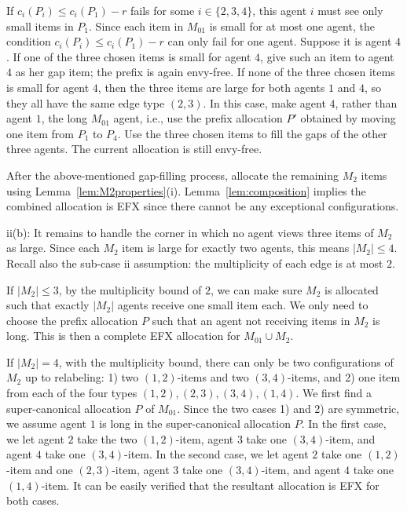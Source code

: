 \documentclass{article}
\theoremstyle{definition}
\begin{document}
If $c_i(P_i)\leq c_i(P_1)-r$ fails for some $i\in\{2,3,4\}$, this agent $i$ must see only small items in $P_1$.  
Since each item in $M_{01}$ is small for at most one agent, the condition $c_i(P_i)\leq c_i(P_1)-r$ can only fail for one agent.
Suppose it is agent $4$.
If one of the three chosen items is small for agent $4$, give such an item to agent $4$ as her gap item; the prefix is again envy-free.  
If none of the
three chosen items is small for agent $4$, then the three items are large for both agents $1$ and $4$, so they all have the same edge type $(2,3)$.  In this case, make agent $4$, rather than agent $1$, the long
$M_{01}$ agent, i.e., use the prefix allocation $P'$ obtained by moving one item from $P_1$ to $P_4$.
Use the three chosen items to fill the gaps of the other
three agents.
The current allocation is still envy-free.

After the above-mentioned gap-filling process, allocate the remaining $M_2$ items using Lemma~\ref{lem:M2properties}(i). Lemma~\ref{lem:composition} implies the combined allocation is EFX since there cannot be any exceptional configurations.

ii(b): It remains to handle the corner in which no agent views three items of $M_2$ as large.  Since each $M_2$ item is large for exactly two agents, this means $|M_2|\le 4$.  
Recall also the sub-case ii assumption: the multiplicity of each edge is at most $2$.

If $|M_2|\leq 3$, by the multiplicity bound of $2$, we can make sure $M_2$ is allocated such that exactly $|M_2|$ agents receive one small item each.
We only need to choose the prefix allocation $P$ such that an agent not receiving items in $M_2$ is long.
This is then a complete EFX allocation for $M_{01}\cup M_2$.

If $|M_2|=4$, with the multiplicity bound, there can only be two configurations of $M_2$ up to relabeling: 1) two $(1,2)$-items and two $(3,4)$-items, and 2) one item from each of the four types $(1,2),(2,3),(3,4),(1,4)$.
We first find a super-canonical allocation $P$ of $M_{01}$.
Since the two cases 1) and 2) are symmetric, we assume agent $1$ is long in the super-canonical allocation $P$.
In the first case, we let agent $2$ take the two $(1,2)$-item, agent $3$ take one $(3,4)$-item, and agent $4$ take one $(3,4)$-item.
In the second case, we let agent $2$ take one $(1,2)$-item and one $(2,3)$-item, agent $3$ take one $(3,4)$-item, and agent $4$ take one $(1,4)$-item.
It can be easily verified that the resultant allocation is EFX for both cases.
\end{document}
